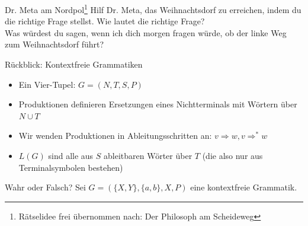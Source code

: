 \begin{frame}{Dr. Meta am Nordpol\footnote{Rätselidee frei übernommen nach: Der Philosoph am Scheideweg}}
	Hilf Dr. Meta, das Weihnachtsdorf zu erreichen, indem du die richtige Frage stellst. Wie lautet die richtige Frage?\\[1em]
	Was würdest du sagen, wenn ich dich morgen fragen würde, ob der linke Weg zum Weihnachtsdorf führt?\\
	\bigskip
	
\end{frame}

\begin{frame}{Rückblick: Kontextfreie Grammatiken}
	\begin{itemize}[<+->]
		\item Ein Vier-Tupel: $G = (N, T, S, P)$
		\item Produktionen definieren Ersetzungen eines Nichtterminals mit Wörtern über $N \cup T$
		\item Wir wenden Produktionen in Ableitungsschritten an: $v \Rightarrow w, v \Rightarrow^* w$
		\item $L(G)$ sind alle aus $S$ ableitbaren Wörter über $T$ (die also nur aus Terminalsymbolen bestehen)
	\end{itemize}
\end{frame}

\begin{frame}{Wahr oder Falsch?}
	Sei $G=(\{X,Y\},\{a,b\},X,P)$ eine kontextfreie Grammatik.
\end{frame}

